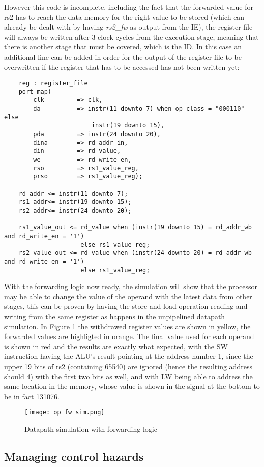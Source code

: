 However this code is incomplete, including the fact that the forwarded value for rs2 has to reach the data memory for the right value to be stored (which can already be dealt with by having \emph{rs2{\_}fw} as output from the IE), the register file will always be written after 3 clock cycles from the execution stage, meaning that there is another stage that must be covered, which is the ID. In this case an additional line can be added in order for the output of the register file to be overwritten if the register that has to be accessed has not been written yet:

\begin{verbatim}
    reg : register_file
    port map(
        clk         => clk,
        da          => instr(11 downto 7) when op_class = "000110"  else 
                        instr(19 downto 15),
        pda         => instr(24 downto 20),
        dina        => rd_addr_in,
        din         => rd_value,
        we          => rd_write_en,
        rso         => rs1_value_reg,
        prso        => rs1_value_reg);

    rd_addr <= instr(11 downto 7);
    rs1_addr<= instr(19 downto 15);
    rs2_addr<= instr(24 downto 20);
    
    rs1_value_out <= rd_value when (instr(19 downto 15) = rd_addr_wb and rd_write_en = '1') 
                     else rs1_value_reg;
    rs2_value_out <= rd_value when (instr(24 downto 20) = rd_addr_wb and rd_write_en = '1') 
                     else rs1_value_reg;
\end{verbatim}
With the forwarding logic now ready, the simulation will show that the processor may be able to change the value of the operand with the latest data from other stages, this can be proven by having the store and load operation reading and writing from the same register as happens in the unpipelined datapath simulation.
In Figure \ref{fig:op_fw_sim} the withdrawed register values are shown in yellow, the forwarded values are highligted in orange. The final value used for each operand is shown in red and the results are exactly what expected, with the SW instruction having the ALU's result pointing at the address number 1, since the upper 19 bits of rs2 (containing 65540) are ignored (hence the resulting address should 4) with the first two bits as well, and with LW being able to address the same location in the memory, whose value is shown in the signal at the bottom to be in fact 131076.

\begin{figure}[!ht]
    \centering
    \texttt{[image: op\_fw\_sim.png]}
    \label{fig:op_fw_sim}
    \caption{Datapath simulation with forwarding logic}
\end{figure}

\subsection{Managing control hazards}
